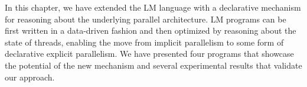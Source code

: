 
In this chapter, we have extended the LM language with a declarative mechanism
for reasoning about the underlying parallel architecture. LM programs can be
first written in a data-driven fashion and then optimized by reasoning about the
state of threads, enabling the move from implicit parallelism to some form of
declarative explicit parallelism. We have presented four programs that showcase
the potential of the new mechanism and several experimental results that
validate our approach.
